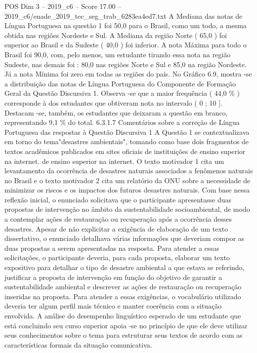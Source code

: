 \begin{textsample}{POS Dim 3 – 2019\_c6 – Score 17.00 – 2019\_c6/enade\_2019\_tec\_seg\_trab\_6283ea4ed7.txt}
A Mediana das notas de Língua Portuguesa na questão 1 foi 50,0 para o Brasil, como um todo, a mesma obtida nas regiões Nordeste e Sul.
A Mediana da região Norte ( 65,0 ) foi superior ao Brasil e da Sudeste ( 40,0 ) foi inferior.
A nota Máxima para todo o Brasil foi 90,0, com, pelo menos, um estudante tirando essa nota na região Sudeste, nas demais foi : 80,0 nas regiões Norte e Sul e 85,0 na região Nordeste.
Já a nota Mínima foi zero em todas as regiões do país.
No Gráfico 6.9, mostra -se a distribuição das notas de Língua Portuguesa do Componente de Formação Geral da Questão Discursiva 1.
Observa -se que a maior frequência ( 44,0 \% ) corresponde à dos estudantes que obtiveram nota no intervalo ( 0 ; 10 ].
Destacam -se, também, os estudantes que deixaram a questão em branco, representando 9,1 \% do total. 6.3.1.7 Comentários sobre a correção de Língua Portuguesa das respostas à Questão Discursiva 1 A Questão 1 se contextualizava em torno do tema"desastres ambientais", tomando como base dois fragmentos de textos acadêmicos publicados em sites oficiais de instituições de ensino superior na internet. de ensino superior na internet.
O texto motivador 1 cita um levantamento da ocorrência de desastres naturais associados a fenômenos naturais no Brasil e o texto motivador 2 cita um relatório da ONU sobre a necessidade de minimizar os riscos e os impactos dos futuros desastres naturais.
Com base nessa reflexão inicial, o enunciado solicitava que o participante apresentasse duas propostas de intervenção no âmbito da sustentabilidade socioambiental, de modo a contemplar ações de restauração ou recuperação após a ocorrência desses desastres.
Apesar de não explicitar a exigência de elaboração de um texto dissertativo, o enunciado detalhava várias informações que deveriam compor as duas propostas a serem apresentadas na resposta.
Para atender a essas solicitações, o participante deveria, para cada proposta, elaborar um texto expositivo para detalhar o tipo de desastre ambiental a que estava se referindo, justificar a proposta de intervenção em função do objetivo de garantir a sustentabilidade ambiental e descrever as ações de restauração ou recuperação inseridas na proposta.
Para atender a essas exigências, o vocabulário utilizado deveria ter algum perfil mais técnico e manter coerência com a situação envolvida.
A análise do desempenho linguístico esperado de um estudante que está concluindo seu curso superior apoia -se no princípio de que ele deve utilizar seus conhecimentos sobre o tema para estruturar seus textos de acordo com as características formais da situação comunicativa.

\end{textsample}
